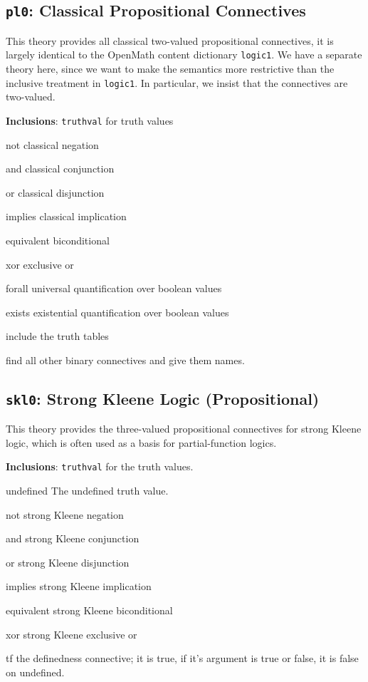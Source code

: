 \documentclass{article}
\def\openmath{{\sc OpenMath}}
\begin{document}
\subsection{{\tt{pl0}}: Classical Propositional Connectives}
This theory provides all classical two-valued propositional connectives, it is
largely identical to the {\openmath} content dictionary {\tt{logic1}}. We have a
separate theory here, since we want to make the semantics more restrictive than
the inclusive treatment in {\tt{logic1}}. In particular, we insist that the
connectives are two-valued.

{\bf{Inclusions}}: {\tt{truthval}} for truth values
\begin{constlist}
  \item[not] classical negation
  \item[and] classical conjunction
  \item[or] classical disjunction
  \item[implies] classical implication
  \item[equivalent] biconditional
  \item[xor] exclusive or
  \item[forall] universal quantification over boolean values
  \item[exists] existential quantification over boolean values
\end{constlist}

\begin{todolist}{}
  \item include the truth tables
  \item find all other binary connectives and give them names. 
\end{todolist}


\subsection{{\tt{skl0}}: Strong Kleene Logic (Propositional)}
This theory provides the three-valued propositional connectives for strong Kleene
logic, which is often used as a basis for partial-function logics. 

{\bf Inclusions}: {\tt{truthval}} for the truth values.
\begin{constlist}
  \item[undefined] The undefined truth value.
  \item[not] strong Kleene negation
  \item[and] strong Kleene conjunction
  \item[or] strong Kleene disjunction
  \item[implies] strong Kleene implication
  \item[equivalent] strong Kleene biconditional
  \item[xor] strong Kleene exclusive or
  \item[tf] the definedness connective; it is true, if it's argument is true or
    false, it is false on undefined.
\end{constlist}
\end{document}
